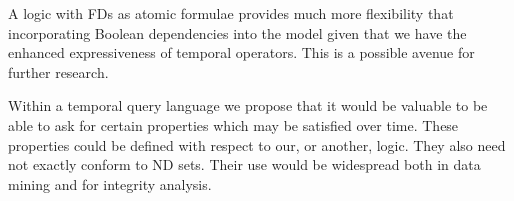 A logic with FDs as atomic formulae provides much more flexibility
that incorporating Boolean dependencies into the model \cite{drs93}
given that we have the enhanced expressiveness of temporal
operators. This is a possible avenue for further research.
 
\medskip

Within a temporal query language we propose that it would be valuable
to be able to ask for certain properties which may be satisfied over
time. These properties could be defined with respect to our, or
another, logic. They also need not exactly conform to ND sets. Their
use would be widespread both in data mining and for integrity
analysis.


























































































